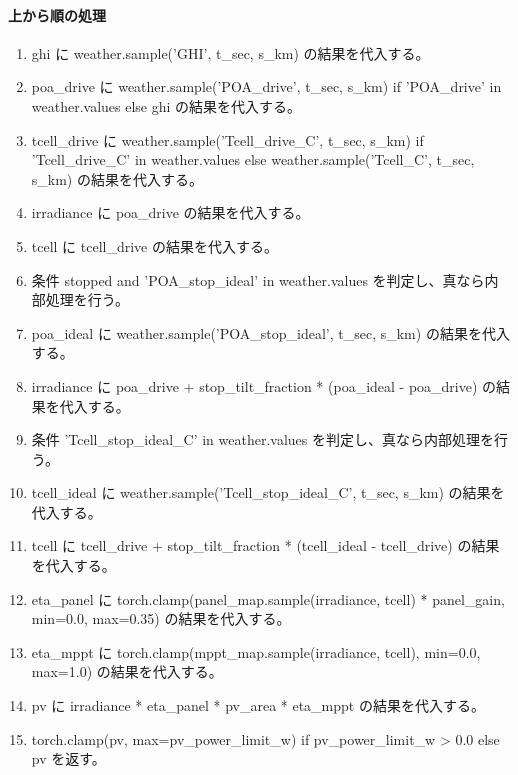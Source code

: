 \documentclass[a4paper,11pt]{article}
\begin{document}
            \paragraph{上から順の処理}
            \begin{enumerate}[leftmargin=1.8em]
            \item ghi に weather.sample('GHI', t\_sec, s\_km) の結果を代入する。
\item poa\_drive に weather.sample('POA\_drive', t\_sec, s\_km) if 'POA\_drive' in weather.values else ghi の結果を代入する。
\item tcell\_drive に weather.sample('Tcell\_drive\_C', t\_sec, s\_km) if 'Tcell\_drive\_C' in weather.values else weather.sample('Tcell\_C', t\_sec, s\_km) の結果を代入する。
\item irradiance に poa\_drive の結果を代入する。
\item tcell に tcell\_drive の結果を代入する。
\item 条件 stopped and 'POA\_stop\_ideal' in weather.values を判定し、真なら内部処理を行う。
\item   poa\_ideal に weather.sample('POA\_stop\_ideal', t\_sec, s\_km) の結果を代入する。
\item   irradiance に poa\_drive + stop\_tilt\_fraction * (poa\_ideal - poa\_drive) の結果を代入する。
\item   条件 'Tcell\_stop\_ideal\_C' in weather.values を判定し、真なら内部処理を行う。
\item     tcell\_ideal に weather.sample('Tcell\_stop\_ideal\_C', t\_sec, s\_km) の結果を代入する。
\item     tcell に tcell\_drive + stop\_tilt\_fraction * (tcell\_ideal - tcell\_drive) の結果を代入する。
\item eta\_panel に torch.clamp(panel\_map.sample(irradiance, tcell) * panel\_gain, min=0.0, max=0.35) の結果を代入する。
\item eta\_mppt に torch.clamp(mppt\_map.sample(irradiance, tcell), min=0.0, max=1.0) の結果を代入する。
\item pv に irradiance * eta\_panel * pv\_area * eta\_mppt の結果を代入する。
\item torch.clamp(pv, max=pv\_power\_limit\_w) if pv\_power\_limit\_w > 0.0 else pv を返す。
            \end{enumerate}
\end{document}
